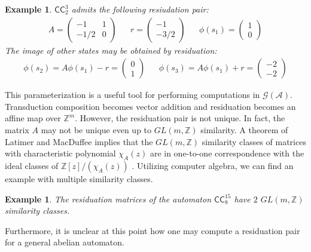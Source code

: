 \documentclass[12pt, letterpaper]{article}
\newcommand{\Z}{\mathbb Z}
\newcommand{\A}{\mathcal A}
\newcommand{\CC}{\mathsf{CC}}
\newcommand{\gp}{\mathcal G}
\newtheorem{example}[thm]{Example}
\begin{document}
\begin{example}
    $\CC^3_2$ admits the following resiudation pair:
    \begin{align*}
        A = \begin{pmatrix}
            -1 & 1\\
            -1/2 & 0
        \end{pmatrix}
        &&
        r = \begin{pmatrix}-1\\-3/2\end{pmatrix}
        &&
        \phi(s_1) = \begin{pmatrix} 1\\0 \end{pmatrix}
    \end{align*}
    The image of other states may be obtained by residuation:
    \begin{align*}
        \phi(s_2) = A \phi(s_1) - r = \begin{pmatrix}
            0\\
            1
        \end{pmatrix}
        &&
        \phi(s_3) = A \phi(s_1) + r = \begin{pmatrix}
            -2\\
            -2
        \end{pmatrix}
    \end{align*}
\end{example}

This parameterization is a useful tool for performing computations in
$\gp(\A)$. Transduction composition becomes vector addition and residuation
becomes an affine map over $\Z^m$.  However, the residuation pair is not
unique. In fact, the matrix $A$ may not be unique even up to $GL(m, \Z)$
similarity.  A theorem of Latimer and MacDuffee implies that the $GL(m, \Z)$
similarity classes of matrices with characteristic polynomial $\chi_A(z)$ are
in one-to-one correspondence with the ideal classes of $\Z[z]/(\chi_A(z))$
\cite{latimer-macduffee}.  Utilizing computer algebra, we can find an example
with multiple similarity classes.
\begin{example}
    The residuation matrices of the automaton $\CC^{15}_8$ have $2$ $GL(m, \Z)$
    similarity classes.
\end{example}

Furthermore, it is unclear at this point how one may compute a residuation pair
for a general abelian automaton.
\end{document}
